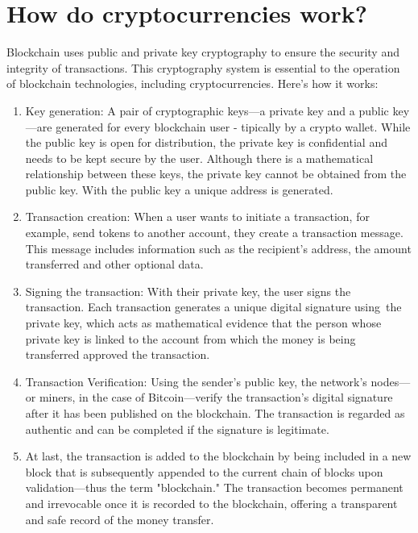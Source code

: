 \section{How do cryptocurrencies work?}
\label{sec:ch2sec2}
\par Blockchain uses public and private key cryptography to ensure the security and integrity of transactions. This cryptography system is essential to the operation of blockchain technologies, including cryptocurrencies. Here's how it works:
\begin{enumerate}
	\item Key generation: A pair of cryptographic keys—a private key and a public key—are generated for every blockchain user - tipically by a crypto wallet. While the public key is open for distribution, the private key is confidential and needs to be kept secure by the user. Although there is a mathematical relationship between these keys, the private key cannot be obtained from the public key. With the public key a unique address is generated.
	\item Transaction creation: When a user wants to initiate a transaction, for example, send tokens to another account, they create a transaction message. This message includes information such as the recipient's address, the amount transferred and other optional data.
	\item Signing the transaction: With their private key, the user signs the transaction. Each transaction generates a unique digital signature using the private key, which acts as mathematical evidence that the person whose private key is linked to the account from which the money is being transferred approved the transaction.
	\item Transaction Verification: Using the sender's public key, the network's nodes—or miners, in the case of Bitcoin—verify the transaction's digital signature after it has been published on the blockchain. The transaction is regarded as authentic and can be completed if the signature is legitimate.
	\item At last, the transaction is added to the blockchain by being included in a new block that is subsequently appended to the current chain of blocks upon validation—thus the term "blockchain." The transaction becomes permanent and irrevocable once it is recorded to the blockchain, offering a transparent and safe record of the money transfer.
\end{enumerate}
